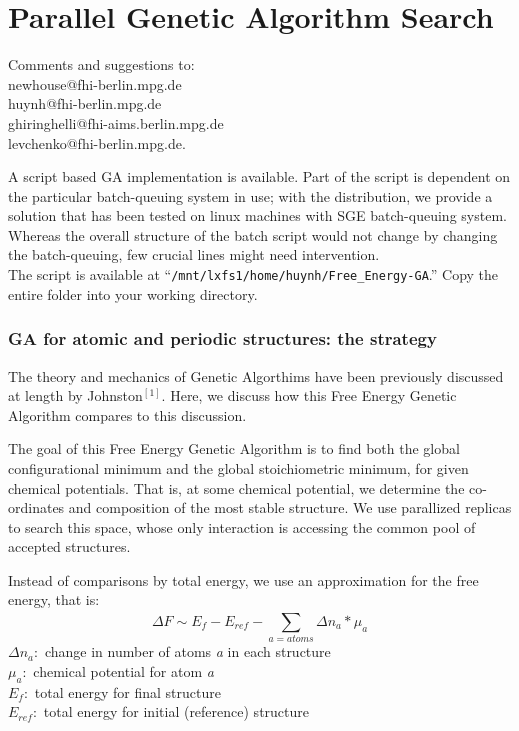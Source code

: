 
\chapter[Genetic Algorithm]{Parallel Genetic Algorithm Search}
\label{appendix_ga}

Comments and suggestions to: \\newhouse@fhi-berlin.mpg.de \\huynh@fhi-berlin.mpg.de \\ghiringhelli@fhi-aims.berlin.mpg.de \\levchenko@fhi-berlin.mpg.de.

A script based GA implementation is available. Part of the script is dependent on the particular batch-queuing system in use; with the distribution, we provide a solution that has been tested on linux machines with SGE batch-queuing system. Whereas the overall structure of the batch script would not change by changing the batch-queuing, few crucial lines might need intervention.\\

The script is available at ``\texttt{/mnt/lxfs1/home/huynh/Free\_Energy-GA}.'' Copy the entire folder into your working directory.

\subsection{GA for atomic and periodic structures: the strategy}
The theory and mechanics of Genetic Algorthims have been previously discussed at length by Johnston$^{[1]}$. Here, we discuss how this Free Energy Genetic Algorithm compares to this discussion. %

The goal of this Free Energy Genetic Algorithm is to find both the global configurational minimum and the global stoichiometric minimum, for given chemical potentials. That is, at some chemical potential, we determine the co-ordinates and composition of the most stable structure. We use parallized replicas to search this space, whose only interaction is accessing the common pool of accepted structures.

Instead of comparisons by total energy, we use an approximation for the free energy, that is:\\
$$\Delta F \sim E_f - E_{ref} -\displaystyle\sum_{a=atoms}^{}\Delta n_a * \mu_{a}$$
$\Delta n_a:$ change in number of atoms {\em a} in each structure\\
$\mu_{a}:$ chemical potential for atom {\em a}\\
$E_f:$ total energy for final structure\\
$E_{ref}:$ total energy for initial (reference) structure\\

